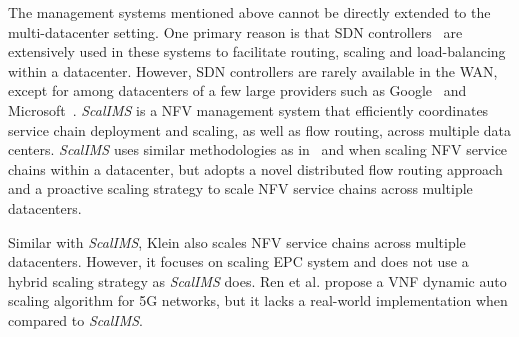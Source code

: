 The management systems mentioned above cannot be directly extended to the multi-datacenter setting. One primary reason is that SDN controllers~\cite{mckeown2008openflow} are extensively used in these systems to facilitate routing, scaling and load-balancing within a datacenter. However, SDN controllers are rarely available in the WAN, except for among datacenters of a few large providers such as Google~\cite{jain2013b4} and Microsoft~\cite{hong2013achieving}.
 \textit{ScalIMS} is a NFV management system that efficiently coordinates service chain deployment and scaling, as well as flow routing, across multiple data centers. \textit{ScalIMS} uses similar methodologies as in~\cite{palkar2015e2} and \cite{gember2012stratos} when scaling NFV service chains within a datacenter, but adopts a novel distributed flow routing approach and a proactive scaling strategy to scale NFV service chains across multiple datacenters.

Similar with \textit{ScalIMS}, Klein \cite{qazi2016klein} also scales NFV service chains across multiple datacenters. However, it focuses on scaling EPC system \cite{epc} and does not use a hybrid scaling strategy as \textit{ScalIMS} does. Ren et al. \cite{ren2016dynamic} propose a VNF dynamic auto scaling algorithm for 5G networks, but it lacks a real-world implementation when compared to \textit{ScalIMS}.
